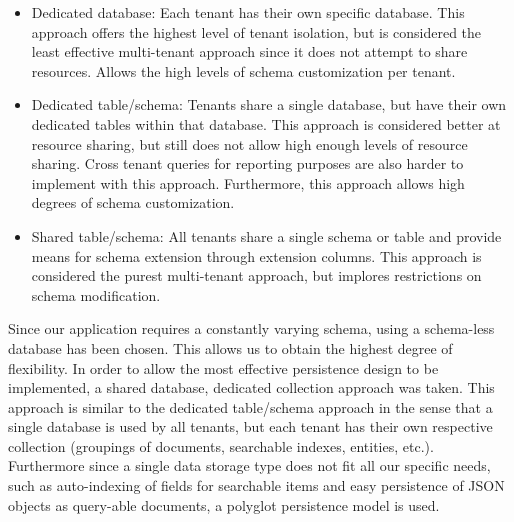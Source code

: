 \begin{itemize}
\item Dedicated database: Each tenant has their own specific database. This approach offers the highest level of tenant isolation, but is considered the least effective multi-tenant approach since it does not attempt to share resources. Allows the high levels of schema customization per tenant.
\item Dedicated table/schema: Tenants share a single database, but have their own dedicated tables within that database. This approach is considered better at resource sharing, but still does not allow high enough levels of resource sharing. Cross tenant queries for reporting purposes are also harder to implement with this approach. Furthermore, this approach allows high degrees of schema customization.
\item Shared table/schema: All tenants share a single schema or table and provide means for schema extension through extension columns. This approach is considered the purest multi-tenant approach, but implores restrictions on schema modification.
\end{itemize}


Since our application requires a constantly varying schema, using a schema-less database has been chosen. This allows us to obtain the highest degree of flexibility. In order to allow the most effective persistence design to be implemented, a shared database, dedicated collection approach was taken. This approach is similar to the dedicated table/schema approach in the sense that a single database is used by all tenants, but each tenant has their own respective collection (groupings of documents, searchable indexes, entities, etc.). Furthermore since a single data storage type does not fit all our specific needs, such as auto-indexing of fields for searchable items and easy persistence of JSON objects as query-able documents, a polyglot persistence model is used.


